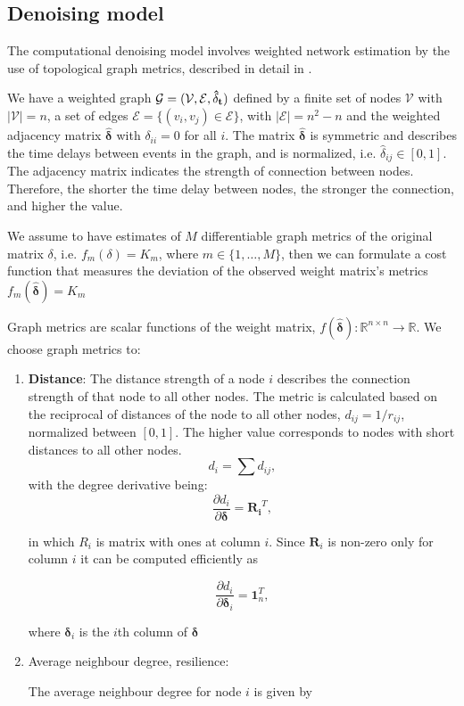 \documentclass[12pt,a4paper,english]{article}
\begin{document}
\subsection{Denoising model}

The computational denoising model involves weighted network estimation by the use of topological graph metrics, described in detail in \cite{Spyrou2017}. 

We have a weighted graph $\mathcal{G} = (\mathcal{V}, \mathcal{E}, \bf{\hat{\delta}}_t)$ defined by a finite set of nodes $\mathcal{V}$ with $|\mathcal{V}| = n$, a set of edges $\mathcal{E} = \{ (v_i,v_j) \in \mathcal{E} \}$, with $|\mathcal{E}| = n^2-n$ and the weighted adjacency matrix $\bm{\hat{\delta}}$ with $\delta_{ii} = 0$ for all $i$. The matrix $\bm{\hat{\delta}}$  is symmetric and describes the time delays between events in the graph, and is normalized, i.e. $\hat{\delta}_{ij}\in [0,1]$. The adjacency matrix indicates the strength of connection between nodes. Therefore, the shorter the time delay between nodes, the stronger the connection, and higher the value. 


We assume to have estimates of $M$ differentiable graph metrics of the original matrix $\delta$, i.e. $f_m(\delta) = K_m$, where $m\in\{ 1,\dots, M \}$, then we can formulate a cost function that measures the deviation of the observed weight matrix's metrics $f_m(\mathbf{\hat{\delta}}) = K_m$ 

Graph metrics are scalar functions of the weight matrix, $f(\bm{\hat{\delta}}): \mathbb{R}^{n \times n}\rightarrow \mathbb{R}$. We choose graph metrics to:
\begin{enumerate}
\item \textbf{Distance}: The distance strength of a node $i$ describes the connection strength of that node to all other nodes. The metric is calculated based on the reciprocal of distances of the node to all other nodes, $d _{ij}= 1/r_{ij}$, normalized between $[0,1]$. The higher value corresponds to nodes with short distances to all other nodes. 
\begin{equation}
d_i = \sum{d_{ij}},  
\end{equation}
with the degree derivative being:
\begin{equation}
\frac{\partial d_i}{\partial \bm{\delta}}= \mathbf{R_i}^T,
\end{equation} 

in which $R_i$ is matrix with ones at column $i$. Since $\mathbf{R}_i$ is non-zero only for column $i$ it can be computed efficiently as 

\begin{equation}
\frac{\partial d_i}{\partial \bm{\delta}_i} = \mathbf{1}_n^T, 
\end{equation} 
 
where $\bm{\delta}_i$ is the $i$th column of $\bm{\delta}$
 
\item Average neighbour degree, resilience: 

The average neighbour degree for node $i$ is given by

\end{enumerate}




  
   
\end{document}
